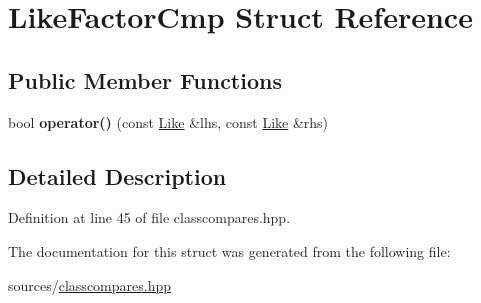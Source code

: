 \hypertarget{structLikeFactorCmp}{
\section{LikeFactorCmp Struct Reference}
\label{structLikeFactorCmp}
}
\subsection*{Public Member Functions}
\begin{DoxyCompactItemize}
\item 
\hypertarget{structLikeFactorCmp_a53f50a486a3a15ab2c58032724ec26f7}{
bool {\bfseries operator()} (const \hyperlink{structLike}{Like} \&lhs, const \hyperlink{structLike}{Like} \&rhs)}
\label{structLikeFactorCmp_a53f50a486a3a15ab2c58032724ec26f7}

\end{DoxyCompactItemize}


\subsection{Detailed Description}


Definition at line 45 of file classcompares.hpp.



The documentation for this struct was generated from the following file:\begin{DoxyCompactItemize}
\item 
sources/\hyperlink{classcompares_8hpp}{classcompares.hpp}\end{DoxyCompactItemize}
